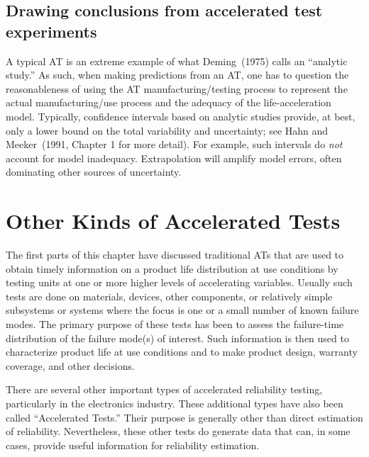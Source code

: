 \subsection{Drawing conclusions from accelerated test experiments}

A typical AT is an extreme example of what Deming~(1975) calls an
``analytic study.''  As such, when making predictions from an AT, one
has to question the reasonableness of using the AT
manufacturing/testing process to represent the actual
manufacturing/use process and the adequacy of the life-acceleration
model.  Typically, confidence intervals based on analytic studies
provide, at best, only a lower bound on the total variability and
uncertainty; see Hahn and Meeker~(1991, Chapter 1 for more detail).
For example, such intervals do {\em not} account for model inadequacy.
Extrapolation will amplify model errors, often dominating
other sources of uncertainty.

\section{Other Kinds of Accelerated Tests}
\label{section:other.kinds.alt}
The first parts of this chapter have discussed traditional ATs that
are used to obtain timely information on a product life distribution
at use  conditions by testing units at one or more higher levels
of accelerating variables. Usually such tests are done on materials,
devices, other components, or relatively simple subsystems or
systems where the focus is one or a small number of known failure
modes.  The primary purpose of these tests has been to assess the
failure-time distribution of the failure mode(s) of interest. Such
information is then used to characterize product life at use
conditions and to make product design, warranty coverage, and other
decisions.

There are several other important types of accelerated reliability
testing, particularly in the electronics industry.  These additional
types have also been called ``Accelerated Tests.''  Their purpose is
generally other than direct estimation of reliability.
Nevertheless, these other tests do generate data that can, in some
cases, provide useful information for reliability estimation.

